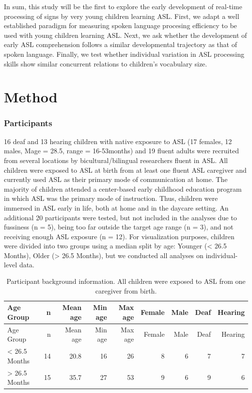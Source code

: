 \documentclass[12pt,]{article}
\begin{document}
In sum, this study will be the first to explore the early development of
real-time processing of signs by very young children learning ASL.
First, we adapt a well established paradigm for measuring spoken
language procesing efficiency to be used with young children learning
ASL. Next, we ask whether the development of early ASL comprehension
follows a similar developmental trajectory as that of spoken language.
Finally, we test whether individual variation in ASL processing skills
show similar concurrent relations to children's vocabulary size.

\section{Method}\label{method}

\subsubsection{Participants}\label{participants}

16 deaf and 13 hearing children with native exposure to ASL (17 females,
12 males, Mage = 28.5, range = 16-53months) and 19 fluent adults were
recruited from several locations by bicultural/bilingual researchers
fluent in ASL. All children were exposed to ASL at birth from at least
one fluent ASL caregiver and currently used ASL as their primary mode of
communication at home. The majority of children attended a center-based
early childhood education program in which ASL was the primary mode of
instruction. Thus, children were immersed in ASL early in life, both at
home and in the daycare setting. An additional 20 participants were
tested, but not included in the analyses due to fussiness (n = 5), being
too far outside the target age range (n = 3), and not receiving enough
ASL exposure (n = 12). For visualization purposes, children were divided
into two groups using a median split by age: Younger (\textless{} 26.5
Months), Older (\textgreater{} 26.5 Months), but we conducted all
analyses on individual-level data.

\begin{longtable}[c]{@{}lrrrrrrrr@{}}
\caption{Participant background information. All children were exposed
to ASL from one caregiver from birth.}\tabularnewline
\toprule
Age Group & n & Mean age & Min age & Max age & Female & Male & Deaf &
Hearing\tabularnewline
\midrule
\endfirsthead
\toprule
Age Group & n & Mean age & Min age & Max age & Female & Male & Deaf &
Hearing\tabularnewline
\midrule
\endhead
\textless{} 26.5 Months & 14 & 20.8 & 16 & 26 & 8 & 6 & 7 &
7\tabularnewline
\textgreater{} 26.5 Months & 15 & 35.7 & 27 & 53 & 9 & 6 & 9 &
6\tabularnewline
\bottomrule
\end{longtable}
\end{document}
